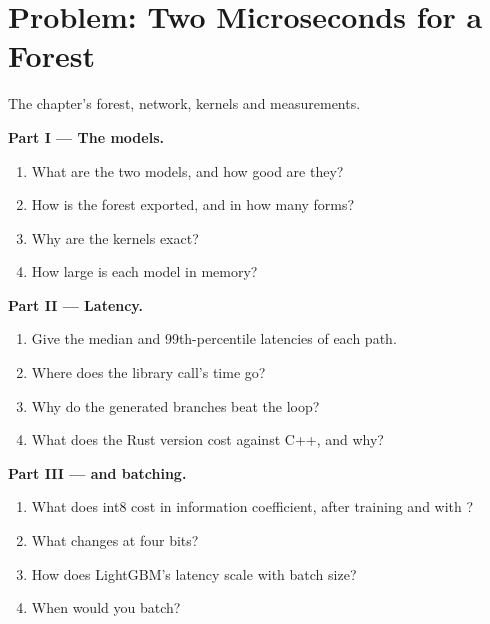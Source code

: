 \section{Problem: Two Microseconds for a Forest}

\begin{problem}\label{pb:ml:low-latency-inference:1}
The chapter's forest, network, kernels and measurements.

\medskip\noindent\textbf{Part I --- The models.}
\begin{enumerate}
\item What are the two models, and how good are they?
\item How is the forest exported, and in how many forms?
\item Why are the kernels exact?
\item How large is each model in memory?
\end{enumerate}

\medskip\noindent\textbf{Part II --- Latency.}
\begin{enumerate}[resume]
\item Give the median and 99th-percentile latencies of each path.
\item Where does the library call's time go?
\item Why do the generated branches beat the loop?
\item What does the Rust version cost against C++, and why?
\end{enumerate}

\medskip\noindent\textbf{Part III ---  and batching.}
\begin{enumerate}[resume]
\item What does int8 cost in information coefficient, after training and with ?
\item What changes at four bits?
\item How does LightGBM's latency scale with batch size?
\item When would you batch?
\end{enumerate}


\end{problem}
